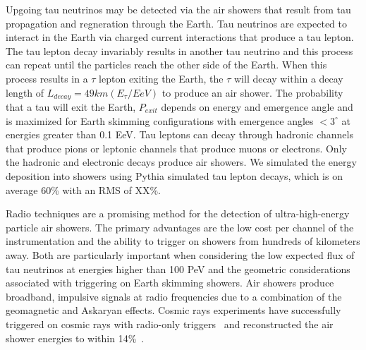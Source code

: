 \documentclass{PoS}
\begin{document}
Upgoing tau neutrinos may be detected via the air showers that result from tau propagation and regneration through the Earth. Tau neutrinos are expected to interact in the Earth via charged current interactions that produce a tau lepton.%
The tau lepton decay invariably results in another tau neutrino and this process can repeat until the particles reach the other side of the Earth. When this process results in a $\tau$ lepton exiting the Earth, the $\tau$ will decay within a decay length of $L_{decay} = 49 km (E_\tau/EeV)$ to produce an air shower. The probability that a tau will exit the Earth, $P_{exit}$ depends on energy and emergence angle and is maximized for Earth skimming configurations with emergence angles $<3^{\circ}$ at energies greater than 0.1 EeV.  Tau leptons can decay through hadronic channels that produce pions or leptonic channels that produce muons or electrons. Only the hadronic and electronic decays produce air showers. We simulated the energy deposition into showers using Pythia simulated tau lepton decays, which is on average 60\% with an RMS of XX\%. 

Radio techniques are a promising method for the detection of ultra-high-energy particle air showers. The primary advantages are the low cost per channel of the instrumentation and the ability to trigger on showers from hundreds of kilometers away. Both are particularly important when considering the low expected flux of tau neutrinos at energies higher than 100 PeV and the geometric considerations associated with triggering on Earth skimming showers. Air showers produce broadband, impulsive signals at radio frequencies due to a combination of the geomagnetic and Askaryan effects. Cosmic rays experiments have successfully triggered on cosmic rays with radio-only triggers~\cite{TREND, OVRO-LWA} and reconstructed the air shower energies to within 14\%~\cite{AERA}.
\end{document}
